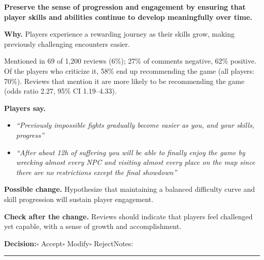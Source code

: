 \documentclass[10pt]{article}
\begin{document}
\begin{tcolorbox}[colback=white,colframe=gP,colbacktitle=lP,coltitle=black,title={\textbf{P6}\quad Gameplay Duration and Engagement\hfill\textcolor{gP}{\textbf{Protect}}},boxrule=0.8pt,arc=2pt,left=6pt,right=6pt,top=4pt,bottom=4pt,before skip=8pt,after skip=8pt]
{\large\textbf{Preserve the sense of progression and engagement by ensuring that player skills and abilities continue to develop meaningfully over time.}}

\smallskip
\textbf{Why.} Players experience a rewarding journey as their skills grow, making previously challenging encounters easier.

\smallskip
{\small Mentioned in 69 of 1,200 reviews (6\%); 27\% of comments negative, 62\% positive. Of the players who criticize it, 58\% end up recommending the game (all players: 70\%). Reviews that mention it are more likely to be recommending the game {\color{ink2}\footnotesize(odds ratio 2.27, 95\% CI 1.19--4.33)}.}

\smallskip
\textbf{Players say.}
\begin{itemize}[leftmargin=12pt,itemsep=1pt,topsep=2pt]
    \item \textit{``Previously impossible fights gradually become easier as you, and your skills, progress''}
    \item \textit{``After about 12h of suffering you will be able to finally enjoy the game by wrecking almost every NPC and visiting almost every place on the map since there are no restrictions except the final showdown''}
\end{itemize}
\textbf{Possible change.} Hypothesize that maintaining a balanced difficulty curve and skill progression will sustain player engagement.

\smallskip
\textbf{Check after the change.} Reviews should indicate that players feel challenged yet capable, with a sense of growth and accomplishment.

\medskip
{\small\textbf{Decision:}\quad $\square$ Accept\quad $\square$ Modify\quad $\square$ Reject\qquad Notes: \rule{0.38\linewidth}{0.4pt}}
\end{tcolorbox}
\end{document}
